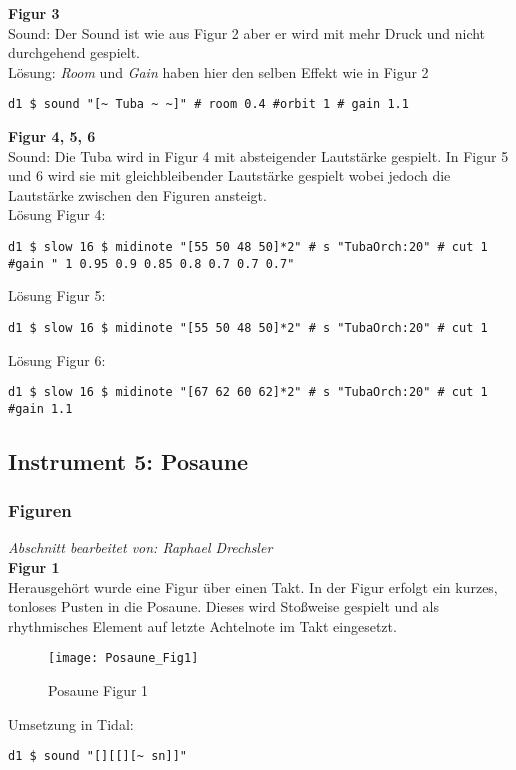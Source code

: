 \documentclass[
10pt, %
a4paper, %
oneside, %
headinclude,footinclude, %
BCOR5mm, %
]{scrartcl}
\begin{document}
\noindent\textbf{Figur 3}\\
Sound: Der Sound ist wie aus Figur 2 aber er wird mit mehr Druck und nicht durchgehend gespielt.\\
Lösung: \textit{Room} und \textit{Gain} haben hier den selben Effekt wie in Figur 2
\begin{lstlisting}
d1 $ sound "[~ Tuba ~ ~]" # room 0.4 #orbit 1 # gain 1.1
\end{lstlisting}
\noindent\textbf{Figur 4, 5, 6}\\
Sound: Die Tuba wird in Figur 4 mit absteigender Lautstärke gespielt. In Figur 5 und 6 wird sie mit gleichbleibender Lautstärke gespielt wobei jedoch die Lautstärke
zwischen den Figuren ansteigt.\\
Lösung Figur 4:
\begin{lstlisting}
d1 $ slow 16 $ midinote "[55 50 48 50]*2" # s "TubaOrch:20" # cut 1 #gain " 1 0.95 0.9 0.85 0.8 0.7 0.7 0.7"
\end{lstlisting}
Lösung Figur 5:
\begin{lstlisting}
d1 $ slow 16 $ midinote "[55 50 48 50]*2" # s "TubaOrch:20" # cut 1
\end{lstlisting}
Lösung Figur 6:
\begin{lstlisting}
d1 $ slow 16 $ midinote "[67 62 60 62]*2" # s "TubaOrch:20" # cut 1 #gain 1.1
\end{lstlisting}

\subsection{Instrument 5: Posaune}
\subsubsection{Figuren}
\textit{Abschnitt bearbeitet von: Raphael Drechsler}\\

\noindent\textbf{Figur 1}\\
Herausgehört wurde eine Figur über einen Takt. In der Figur erfolgt ein kurzes, tonloses Pusten in die Posaune. Dieses wird Stoßweise gespielt und als rhythmisches Element auf letzte Achtelnote im Takt eingesetzt.
\begin{figure}[h]
	\centering 
	\texttt{[image: Posaune\_Fig1]} 
	\caption{Posaune Figur 1}
\end{figure}

\noindent Umsetzung in Tidal:
\begin{lstlisting}
d1 $ sound "[][[][~ sn]]"
\end{lstlisting}
\end{document}
